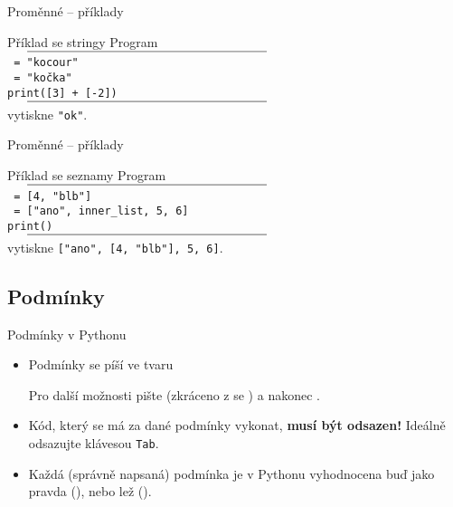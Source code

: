 \begin{frame}{Proměnné -- příklady}
 \begin{block}{Příklad se stringy}
  \vspace{6pt}
  Program\\
  $\vcenter{\rule{.55\textwidth}{0.4pt}}$\\
  \texttt{ = "kocour"}\\
  \texttt{ = "kočka"}\\
  \texttt{print([3] + [-2])}\\
  $\vcenter{\rule{.55\textwidth}{0.4pt}}$\\
  vytiskne \texttt{"ok"}.
 \end{block}
\end{frame}

\begin{frame}{Proměnné -- příklady}
 \begin{block}{Příklad se seznamy}
  \vspace{6pt}
  Program\\
  $\vcenter{\rule{.55\textwidth}{0.4pt}}$\\
  \texttt{ = [4, "blb"]}\\
  \texttt{ = ["ano", inner_list, 5, 6]}\\
  \texttt{print()}\\
  $\vcenter{\rule{.55\textwidth}{0.4pt}}$\\
  vytiskne \texttt{["ano", [4, "blb"], 5, 6]}.
 \end{block}
\end{frame}

\subsection[Podmínky]{Podmínky}

\begin{frame}{Podmínky v Pythonu}
 \begin{itemize}
  \item<1-> Podmínky se píší ve tvaru
   \begin{center}
   \end{center}
   Pro další možnosti pište \texttt{} (zkráceno z se )
   a nakonec \texttt{}.
  \item<2-> Kód, který se má za dané podmínky vykonat, \textbf{musí být
   odsazen!} Ideálně odsazujte klávesou \texttt{Tab}.
  \item<3-> Každá (správně napsaná) podmínka je v Pythonu vyhodnocena buď jako
   pravda (\texttt{}), nebo lež (\texttt{}).
 \end{itemize}
\end{frame}


